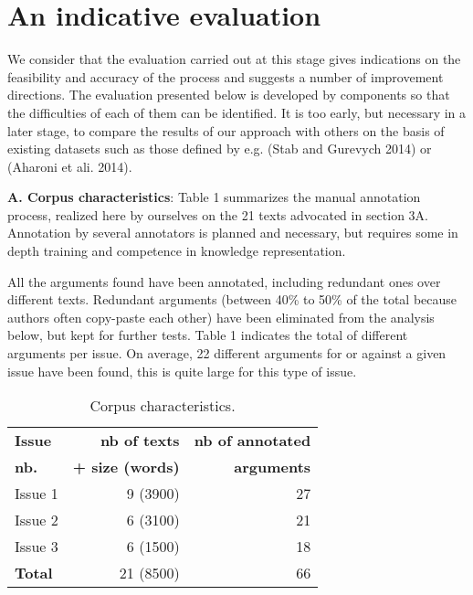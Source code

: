 \documentclass[11pt,letterpaper]{article}
\begin{document}
\section{An indicative evaluation}

We consider that the evaluation carried out at this stage gives indications on the feasibility and accuracy of the process and suggests a number of improvement directions.
The evaluation presented below is developed by components so that the difficulties of each of them can be identified. It is too early, but necessary in a later stage, to compare the results of our approach with others on the basis of  existing datasets such as those defined by e.g. (Stab and Gurevych 2014) or (Aharoni et ali. 2014).

{\bf A. Corpus characteristics}:
Table 1 summarizes the manual annotation process, realized here by ourselves on the 21 texts advocated in section 3A. Annotation by several annotators is planned and necessary, but requires some in depth training and competence in knowledge representation.

All the arguments found have been annotated, including redundant ones over different texts. Redundant arguments (between 40\% to 50\% of the total because authors often copy-paste each other) have been eliminated from the analysis below, but kept for further tests. Table 1 indicates the total of different arguments per issue. On average, 22 different arguments for or against a given issue have been found, this is quite large for this type of issue.

\begin{table}
\small
\centering
\begin{tabular}{|l|r | r|}
\hline \bf Issue & \bf nb of texts  & \bf nb of annotated \\
\bf nb. & \bf + size (words) & \bf  arguments \\ \hline
Issue 1 & 9 (3900) & 27 \\
Issue 2 & 6 (3100) & 21\\
Issue 3 & 6 (1500) & 18\\
\hline
\bf Total & 21 (8500) & 66\\
\hline
\end{tabular}
\caption{\label{corpus} Corpus characteristics.}
\end{table}
\end{document}
